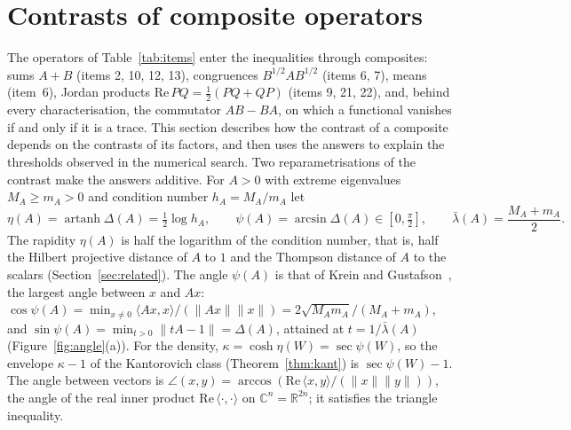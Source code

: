 \documentclass[11pt]{article}
\newcommand{\C}{\mathbb{C}}
\newcommand{\R}{\mathbb{R}}
\renewcommand{\Re}{\mathrm{Re}\,}
\theoremstyle{plain}
\theoremstyle{definition}
\theoremstyle{remark}
\begin{document}
\section{Contrasts of composite operators}\label{sec:composite}

The operators of Table~\ref{tab:items} enter the inequalities through composites: sums $A+B$ (items 2, 10, 12, 13),
congruences $B^{1/2}AB^{1/2}$ (items 6, 7), means (item~6), Jordan products $\Re PQ=\frac12(PQ+QP)$ (items 9, 21, 22),
and, behind every characterisation, the commutator $AB-BA$, on which a functional vanishes if and only if it is a trace.
This section describes how the contrast of a composite depends on the contrasts of its factors, and then uses the
answers to explain the thresholds observed in the numerical search. Two reparametrisations of the contrast make the
answers additive. For $A>0$ with extreme eigenvalues $M_A\ge m_A>0$ and condition number $h_A=M_A/m_A$ let
\[
  \eta(A)=\operatorname{artanh}\Delta(A)=\tfrac12\log h_A,\qquad
  \psi(A)=\arcsin\Delta(A)\in[0,\tfrac\pi2],\qquad \bar\lambda(A)=\frac{M_A+m_A}2 .
\]
The rapidity $\eta(A)$ is half the logarithm of the condition number, that is, half the Hilbert projective distance of
$A$ to $1$ and the Thompson distance of $A$ to the scalars (Section~\ref{sec:related}). The angle $\psi(A)$ is that of
Krein and Gustafson~\cite{krein1969,gustafson1968,gustafsonrao1997}, the largest angle between $x$ and $Ax$:
$\cos\psi(A)=\min_{x\ne0}\langle Ax,x\rangle/(\|Ax\|\|x\|)=2\sqrt{M_Am_A}/(M_A+m_A)$, and
$\sin\psi(A)=\min_{t>0}\|tA-1\|=\Delta(A)$, attained at $t=1/\bar\lambda(A)$ (Figure~\ref{fig:angle}(a)). For the density, $\kappa=\cosh\eta(W)=\sec\psi(W)$, so the envelope $\kappa-1$ of the Kantorovich class
(Theorem~\ref{thm:kant}) is $\sec\psi(W)-1$. The angle between vectors is $\angle(x,y)=\arccos(\Re\langle x,y\rangle/
(\|x\|\|y\|))$, the angle of the real inner product $\Re\langle\cdot,\cdot\rangle$ on $\C^n=\R^{2n}$; it satisfies the
triangle inequality.
\end{document}

